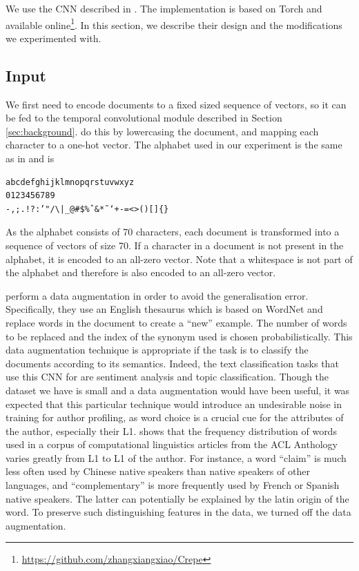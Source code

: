 We use the CNN described in \citep{zhang2015character}.
The implementation is based on Torch \citep{torch} and available online\footnote{\url{https://github.com/zhangxiangxiao/Crepe}}.
In this section, we describe their design and the modifications we experimented with.
\subsection{Input}
\label{sub:input}
We first need to encode documents to a fixed sized sequence of vectors, so it can be fed to the temporal convolutional module described in Section \ref{sec:background}.
\cite{zhang2015character} do this by lowercasing the document, and mapping each character to a one-hot vector.
The alphabet used in our experiment is the same as in \citep{zhang2015character} and is 
\begin{verbatim}
abcdefghijklmnopqrstuvwxyz
0123456789
-,;.!?:’"/\|_@#$%ˆ&*˜‘+-=<>()[]{}
\end{verbatim} 
As the alphabet consists of 70 characters, each document is transformed into a sequence of vectors of size 70.
If a character in a document is not present in the alphabet, it is encoded to an all-zero vector.
Note that a whitespace is not part of the alphabet and therefore is also encoded to an all-zero vector.

\cite{zhang2015character} perform a data augmentation in order to avoid the generalisation error.
Specifically, they use an English thesaurus which is based on WordNet \cite{fellbaum1998wordnet} and replace words in the document to create a ``new'' example.
The number of words to be replaced and the index of the synonym used is chosen probabilistically.
This data augmentation technique is appropriate if the task is to classify the documents according to its semantics.
Indeed, the text classification tasks that \cite{zhang2015character} use this CNN for are sentiment analysis and topic classification.
Though the dataset we have is small and a data augmentation would have been useful, it was expected that this particular technique would introduce an undesirable noise in training for author profiling, as word choice is a crucial cue for the attributes of the author, especially their L1.
\cite{yarowsky2013learning} shows that the frequency distribution of words used in a corpus of computational linguistics articles from the ACL Anthology varies greatly from L1 to L1 of the author.
For instance, a word ``claim'' is much less often used by Chinese native speakers than native speakers of other languages, and ``complementary'' is more frequently used by French or Spanish native speakers.
The latter can potentially be explained by the latin origin of the word.
To preserve such distinguishing features in the data, we turned off the data augmentation.

